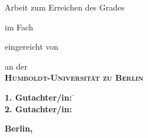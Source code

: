 \makeatletter
\begin{titlepage}
\doublespacing\centering%
\vspace*{-24.5mm}\noindent\makebox[\textwidth]{\phantom{Vadid Gissnkra}\hspace*{-19mm}}

\textbf{\Huge \@title}\vskip 2.5mm

\textbf{\Large \@subtitle}\vfill

{\large Arbeit zum Erreichen des Grades}\\
\textbf{\Large\degreevar}\vfill

{\large im Fach}\\
\resizebox{%
      \ifdim\width>\textwidth
        \textwidth
      \else
        \width
      \fi
    }{!}{%
    \textbf{\Large\programmevar}}\vfill

{\large eingereicht von}\\
\resizebox{%
      \ifdim\width>\textwidth
        \textwidth
      \else
        \width
      \fi
    }{!}{%
    \textbf{\Large \@author}}\vfill

{\large an der}\\
\textbf{\Large\scshape Humboldt-Universität zu Berlin}\vfill

\resizebox{%
      \ifdim\width>\textwidth
        \textwidth
      \else
        \width
      \fi
    }{!}{%
    \textbf{\Large\scshape\facultyvar}}

\resizebox{%
      \ifdim\width>\textwidth
        \textwidth
      \else
        \width
      \fi
    }{!}{%
    \textbf{\Large\scshape\institutevar}}\vfill

\parbox{0cm}{\large%
    \begin{tabbing}
        \textbf{1. Gutachter/in:} \= \firstsupervisorvar\\
        \textbf{2. Gutachter/in:} \> \secondsupervisorvar
    \end{tabbing}
}\vfill


\enlargethispage{16mm}\textbf{\large Berlin, \@date}
\end{titlepage}
\makeatother
